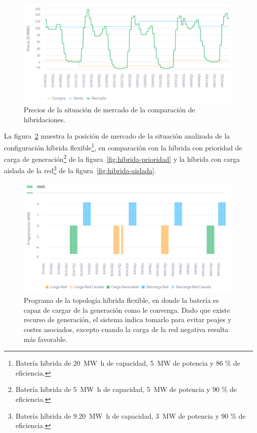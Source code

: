 \begin{figure}
  \centering
  \includegraphics[width=0.75\linewidth]{figures/precios-hibridaciones.png}
  \caption[Precios de la situación de mercado de la comparación de hibridaciones.]{Precios de la situación de mercado de la comparación de hibridaciones.}
  \label{fig:precios-hibridaciones}
\end{figure}

La figura~\ref{fig:hibrida-flexible} muestra la posición de mercado de la situación analizada de la configuración híbrida flexible\footnote{Batería híbrida de \SI{20}{{\mega\watt\hour}} de capacidad, \SI{5}{{\mega\watt}} de potencia y 86 \% de eficiencia.}, en comparación con la híbrida con prioridad de carga de generación\footnote{Batería híbrida de \SI{5}{{\mega\watt\hour}} de capacidad, \SI{5}{{\mega\watt}} de potencia y 90 \% de eficiencia.} de la figura~\ref{fig:hibrida-prioridad} y la híbrida con carga aislada de la red\footnote{Batería híbrida de \SI{9.20}{{\mega\watt\hour}} de capacidad, \SI{3}{{\mega\watt}} de potencia y 90 \% de eficiencia.} de la figura~\ref{fig:hibrida-aislada}.

\begin{figure}
  \centering
  \includegraphics[width=0.75\linewidth]{figures/hibrida-flexible.png}
  \caption[Programa de la topología híbrida flexible.]{Programa de la topología híbrida flexible, en donde la batería es capaz de cargar de la generación como le convenga. Dado que existe recurso de generación, el sistema indica tomarlo para evitar peajes y costes asociados, excepto cuando la carga de la red negativa resulta más favorable.}
  \label{fig:hibrida-flexible}
\end{figure}

